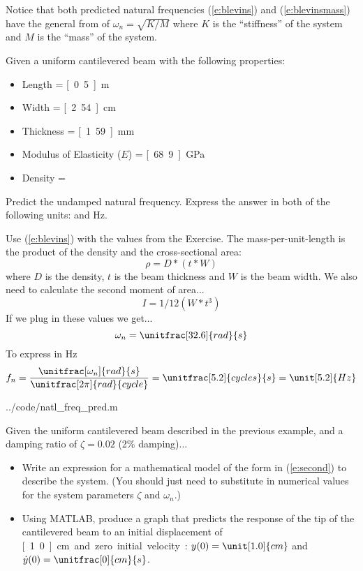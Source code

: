 Notice that both predicted natural frequencies (\ref{e:blevins}) and (\ref{e:blevinsmass}) have the general from of $\omega_n = \sqrt{K/M}$ where $K$ is the ``stiffness'' of the system and $M$ is the ``mass'' of the system.


\begin{ex}\label{ex:beamvib}
Given a uniform cantilevered beam with the following properties:
\begin{itemize}
\item Length = \unit[0.5]{m}
\item Width = \unit[2.54]{cm}
\item Thickness = \unit[1.59]{mm}
\item Modulus of Elasticity ($E$) = \unit[68.9]{GPa}
\item Density = 
\end{itemize}
Predict the undamped natural frequency.  Express the answer in both of the following units:  and \unit[]{Hz}.
\end{ex}

\ifsolutions
\begin{soln}
Use (\ref{e:blevins}) with the values from the Exercise.  The mass-per-unit-length is the product of the density and the cross-sectional area:
\[ \rho = D*(t*W) \]
where $D$ is the density, $t$ is the beam thickness and $W$ is the beam width.
We also need to calculate the second moment of area...
\[ I = 1/12(W*t^3) \]
If we plug in these values we get...
\[ \omega_n = \unitfrac[32.6]{rad}{s} \]
To express in Hz
\[ f_n = \frac{\unitfrac[\omega_n]{rad}{s}}{\unitfrac[2\pi]{rad}{cycle}} = \unitfrac[5.2]{cycles}{s}=\unit[5.2]{Hz}
\]


{../code/natl_freq_pred.m}

\end{soln}
\fi

\begin{ex}\label{ex:model2sim}
Given the uniform cantilevered beam described in the previous example, and a damping ratio of $\zeta=0.02$ (2\% damping)...
\begin{itemize}
\item Write an expression for a mathematical model of the form in (\ref{e:second}) to describe the system.  (You should just need to substitute in numerical values for the system parameters $\zeta$ and $\omega_n$.)
\item Using MATLAB, produce a graph that predicts the response of the tip of the cantilevered beam to an initial displacement of \unit[1.0]{cm} and zero initial velocity: $y(0)=\unit[1.0]{cm}$ and $\dot{y}(0) = \unitfrac[0]{cm}{s}$.
\end{itemize}
\end{ex}

